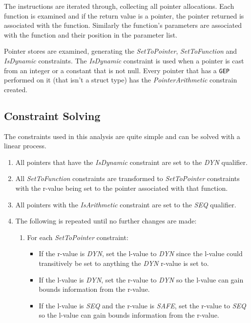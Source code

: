 The instructions are iterated through, collecting all pointer allocations.
Each function is examined and if the return value is a pointer, the pointer returned is associated with the function.
Similarly the function's parameters are associated with the function and their position in the parameter list.

Pointer stores are examined, generating the \textit{SetToPointer}, \textit{SetToFunction} and \textit{IsDynamic} constraints.
The \textit{IsDynamic} constraint is used when a pointer is cast from an integer or a constant that is not null.
Every pointer that has a \verb!GEP! performed on it (that isn't a struct type) has the \textit{PointerArithmetic} constrain created.

\subsection{Constraint Solving}

The constraints used in this analysis are quite simple and can be solved with a linear process.

\begin{enumerate}
\item All pointers that have the \textit{IsDynamic} constraint are set to the \textit{DYN} qualifier.
\item All \textit{SetToFunction} constraints are transformed to \textit{SetToPointer} constraints with the r-value being set to the pointer associated with that function.
\item All pointers with the \textit{IsArithmetic} constraint are set to the \textit{SEQ} qualifier.
\item The following is repeated until no further changes are made:
    \begin{enumerate}
        \item For each \textit{SetToPointer} constraint:
        \begin{itemize}
            \item If the r-value is \textit{DYN}, set the l-value to \textit{DYN} since the l-value could transitively be set to anything the \textit{DYN} r-value is set to.
            \item If the l-value is \textit{DYN}, set the r-value to \textit{DYN} so the l-value can gain bounds information from the r-value.
            \item If the l-value is \textit{SEQ} and the r-value is \textit{SAFE}, set the r-value to \textit{SEQ} so the l-value can gain bounds information from the r-value.
        \end{itemize}
    \end{enumerate}
\end{enumerate}

